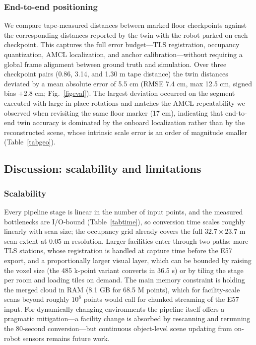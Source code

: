 \documentclass[conference]{IEEEtran}
\begin{document}
\subsubsection{End-to-end positioning} We compare tape-measured
distances between marked floor checkpoints against the corresponding
distances reported by the twin with the robot parked on each
checkpoint. This captures the full error budget---TLS registration,
occupancy quantization, AMCL localization, and anchor
calibration---without requiring a global frame alignment between
ground truth and simulation. Over three checkpoint pairs (0.86, 3.14,
and 1.30 m tape distance) the twin distances deviated by a mean
absolute error of 5.5 cm (RMSE 7.4 cm, max 12.5 cm, signed bias
$+$2.8 cm; Fig.~\ref{figeval}). The largest deviation occurred on the segment
executed with large in-place rotations and matches the AMCL
repeatability we observed when revisiting the same floor marker
(17 cm), indicating that end-to-end twin accuracy is dominated by the
onboard localization rather than by the reconstructed scene, whose
intrinsic scale error is an order of magnitude smaller
(Table~\ref{tabgeo}).

\subsection{Discussion: scalability and limitations}
\label{sec:discussion}
\subsubsection{Scalability} Every pipeline stage is linear in the
number of input points, and the measured bottlenecks are I/O-bound
(Table~\ref{tabtime}), so conversion time scales roughly linearly
with scan size; the occupancy grid already covers the full
$32.7\times23.7$ m scan extent at 0.05 m resolution. Larger
facilities enter through two paths: more TLS stations, whose
registration is handled at capture time before the E57 export, and a
proportionally larger visual layer, which can be bounded by raising
the voxel size (the 485 k-point variant converts in 36.5 s) or by
tiling the stage per room and loading tiles on demand. The main
memory constraint is holding the merged cloud in RAM (8.1 GB for
68.5 M points), which for facility-scale scans beyond roughly
$10^8$ points would call for chunked streaming of the E57 input.
For dynamically changing environments the pipeline itself offers a
pragmatic mitigation---a facility change is absorbed by rescanning
and rerunning the 80-second conversion---but continuous object-level
scene updating from on-robot sensors remains future work.
\end{document}
